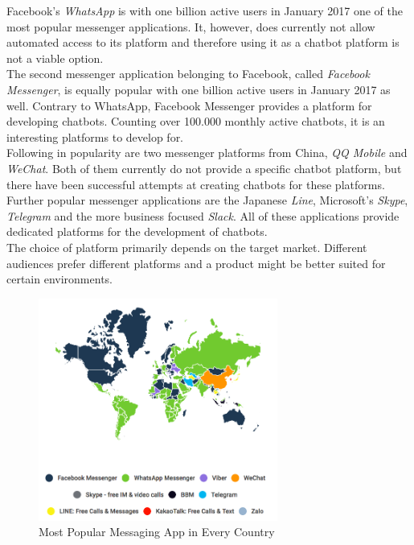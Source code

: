Facebook's \emph{WhatsApp} is with one billion active users in January 2017 one of the most popular messenger applications\cite{fbpopular}.
It, however, does currently not allow automated access to its platform and therefore using it as a chatbot platform is not a viable option.
\\

The second messenger application belonging to Facebook, called \emph{Facebook Messenger}, is equally popular with one billion active users in January 2017 as well\cite{fbpopular}.
Contrary to WhatsApp, Facebook Messenger provides a platform for developing chatbots.
Counting over 100.000 monthly active chatbots\cite{messenger}, it is an interesting platforms to develop for.
\\

Following in popularity\cite{appusage} are two messenger platforms from China, \emph{QQ Mobile} and \emph{WeChat}.
Both of them currently do not provide a specific chatbot platform,
but there have been successful attempts at creating chatbots for these platforms\cite{wechatbot}.
\\

Further popular messenger applications are the Japanese \emph{Line}, Microsoft's \emph{Skype}, \emph{Telegram} and the more business focused \emph{Slack}.
All of these applications provide dedicated platforms for the development of chatbots.
\\

The choice of platform primarily depends on the target market.
Different audiences prefer different platforms and a product might be better suited for certain environments.

\begin{figure}[H]
	\centering
	\includegraphics[width=0.7\textwidth]{images/similarweb-messenger-by-country.png}
	\caption{Most Popular Messaging App in Every Country\cite{similarweb}}
	\label{fig:similarweb}
\end{figure}

